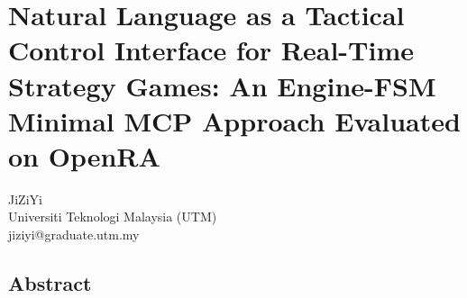 \documentclass[
  journal]{IEEEtran}
\author{}
\date{}
\begin{document}
\section{Natural Language as a Tactical Control Interface for Real-Time
Strategy Games: An Engine-FSM Minimal MCP Approach Evaluated on
OpenRA}\label{natural-language-as-a-tactical-control-interface-for-real-time-strategy-games-an-engine-fsm-minimal-mcp-approach-evaluated-on-openra}

JiZiYi\\
Universiti Teknologi Malaysia (UTM)\\
jiziyi@graduate.utm.my

\subsection{Abstract}\label{abstract}
\end{document}
